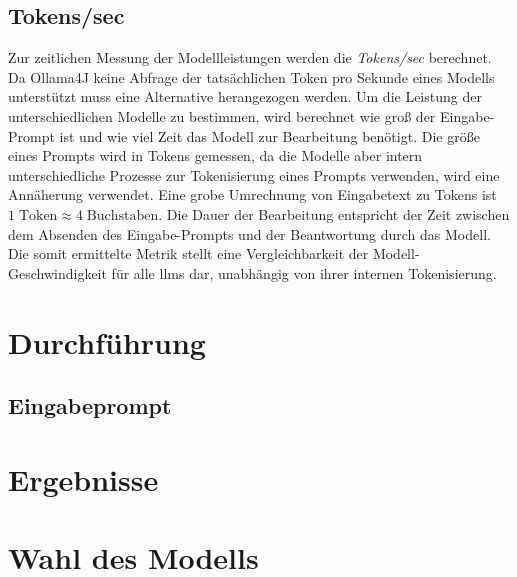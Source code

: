 \subsection{Tokens/sec}
Zur zeitlichen Messung der Modellleistungen werden die \textit{Tokens/sec} berechnet.
Da Ollama4J keine Abfrage der tatsächlichen Token pro Sekunde eines Modells unterstützt muss eine Alternative herangezogen werden.
Um die Leistung der unterschiedlichen Modelle zu bestimmen, wird berechnet wie groß der Eingabe-Prompt ist und wie viel Zeit das Modell zur Bearbeitung benötigt.
Die größe eines Prompts wird in Tokens gemessen, da die Modelle aber intern unterschiedliche Prozesse zur Tokenisierung eines Prompts verwenden, wird eine Annäherung verwendet.
Eine grobe Umrechnung von Eingabetext zu Tokens ist $1\;\text{Token}\approx 4\;\text{Buchstaben}$\autocite{noauthor_what_nodate}.
Die Dauer der Bearbeitung entspricht der Zeit zwischen dem Absenden des Eingabe-Prompts und der Beantwortung durch das Modell.
Die somit ermittelte Metrik stellt eine Vergleichbarkeit der Modell-Geschwindigkeit für alle \glspl{llm} dar, unabhängig von ihrer internen Tokenisierung.


\section{Durchführung}\label{sec:durchfuhrung-benchmark}


\subsection{Eingabeprompt}


\section{Ergebnisse}\label{sec:ergebnisse-benchmark}


\section{Wahl des Modells}\label{sec:auswahl-modell-benchmark}

